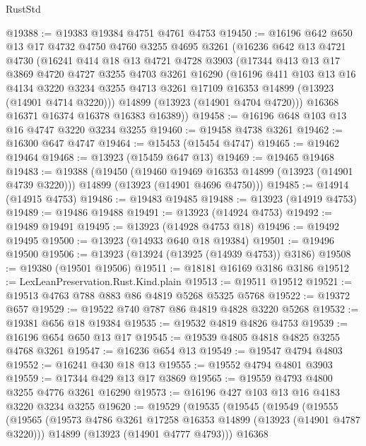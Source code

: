 \begin{lexlean}{RustStd}
\begin{coremodule}
@19388 := @19383 @19384 @4751 @4761 @4753
@19450 := @16196
    @642
    @650
    @13
    @17
    @4732
    @4750
    @4760
    @3255
    @4695
    @3261
    (@16236
      @642
      @13
      @4721
      @4730
      (@16241
        @414
        @18
        @13
        @4721
        @4728
        @3903
        (@17344
          @413
          @13
          @17
          @3869
          @4720
          @4727
          @3255
          @4703
          @3261
          @16290
          (@16196
            @411
            @103
            @13
            @16
            @4134
            @3220
            @3234
            @3255
            @4713
            @3261
            @17109
            @16353
            @14899
            (@13923 (@14901 @4714 @3220)))
          @14899
          (@13923 (@14901 @4704 @4720)))
        @16368
        @16371
        @16374
        @16378
        @16383
        @16389))
@19458 := @16196 @648 @103 @13 @16 @4747 @3220 @3234 @3255
@19460 := @19458 @4738 @3261
@19462 := @16300 @647 @4747
@19464 := @15453 (@15454 @4747)
@19465 := @19462 @19464
@19468 := @13923 (@15459 @647 @13)
@19469 := @19465 @19468
@19483 := @19388
    (@19450
      (@19460 @19469 @16353 @14899 (@13923 (@14901 @4739 @3220)))
      @14899
      (@13923 (@14901 @4696 @4750)))
@19485 := @14914 (@14915 @4753)
@19486 := @19483 @19485
@19488 := @13923 (@14919 @4753)
@19489 := @19486 @19488
@19491 := @13923 (@14924 @4753)
@19492 := @19489 @19491
@19495 := @13923 (@14928 @4753 @18)
@19496 := @19492 @19495
@19500 := @13923 (@14933 @640 @18 @19384)
@19501 := @19496 @19500
@19506 := @13923 (@13924 (@13925 (@14939 @4753)) @3186)
@19508 := @19380 (@19501 @19506)
@19511 := @18181 @16169 @3186 @3186
@19512 := LexLeanPreservation.Rust.Kind.plain
@19513 := @19511 @19512
@19521 := @19513 @4763 @788 @883 @86 @4819 @5268 @5325 @5768
@19522 := @19372 @657
@19529 := @19522 @740 @787 @86 @4819 @4828 @3220 @5268
@19532 := @19381 @656 @18 @19384
@19535 := @19532 @4819 @4826 @4753
@19539 := @16196 @654 @650 @13 @17
@19545 := @19539 @4805 @4818 @4825 @3255 @4768 @3261
@19547 := @16236 @654 @13
@19549 := @19547 @4794 @4803
@19552 := @16241 @430 @18 @13
@19555 := @19552 @4794 @4801 @3903
@19559 := @17344 @429 @13 @17 @3869
@19565 := @19559 @4793 @4800 @3255 @4776 @3261 @16290
@19573 := @16196 @427 @103 @13 @16 @4183 @3220 @3234 @3255
@19620 := @19529
    (@19535
      (@19545
        (@19549
          (@19555
            (@19565
              (@19573 @4786 @3261 @17258 @16353 @14899 (@13923 (@14901 @4787 @3220)))
              @14899
              (@13923 (@14901 @4777 @4793)))
            @16368

\end{coremodule}
\end{lexlean}
